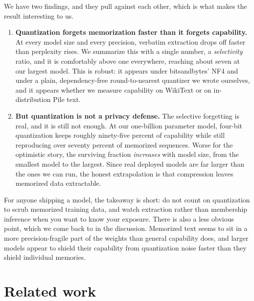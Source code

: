 \documentclass{article}
\begin{document}
We have two findings, and they pull against each other, which is what makes
the result interesting to us.

\begin{enumerate}
  \item \textbf{Quantization forgets memorization faster than it forgets
    capability.} At every model size and every precision, verbatim
    extraction drops off faster than perplexity rises. We summarize this with
    a single number, a \emph{selectivity} ratio, and it is comfortably above
    one everywhere, reaching about seven at our largest model. This is
    robust: it appears under bitsandbytes' NF4 and under a plain,
    dependency-free round-to-nearest quantizer we wrote ourselves, and it
    appears whether we measure capability on WikiText or on in-distribution
    Pile text.
  \item \textbf{But quantization is not a privacy defense.} The selective
    forgetting is real, and it is still not enough. At our one-billion
    parameter model, four-bit quantization keeps roughly ninety-five percent
    of capability while still reproducing over seventy percent of memorized
    sequences. Worse for the optimistic story, the surviving fraction
    \emph{increases} with model size, from the smallest model to the largest.
    Since real deployed models are far larger than the ones we can run, the
    honest extrapolation is that compression leaves memorized data
    extractable.
\end{enumerate}

For anyone shipping a model, the takeaway is short: do not count on
quantization to scrub memorized training data, and watch extraction rather
than membership inference when you want to know your exposure. There is also
a less obvious point, which we come back to in the discussion. Memorized text
seems to sit in a more precision-fragile part of the weights than general
capability does, and larger models appear to shield their capability from
quantization noise faster than they shield individual memories.

\section{Related work}
\end{document}
